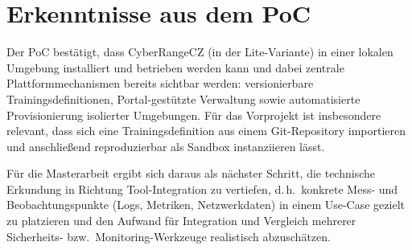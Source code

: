 \section{Erkenntnisse aus dem PoC}
\label{sec:poc-erkenntnisse}

Der PoC bestätigt, dass CyberRangeCZ (in der Lite-Variante) in einer lokalen Umgebung
installiert und betrieben werden kann und dabei zentrale Plattformmechanismen bereits sichtbar werden:
versionierbare Trainingsdefinitionen, Portal-gestützte Verwaltung sowie automatisierte Provisionierung
isolierter Umgebungen. Für das Vorprojekt ist insbesondere relevant, dass sich eine Trainingsdefinition
aus einem Git-Repository importieren und anschließend reproduzierbar als Sandbox instanziieren lässt.

Für die Masterarbeit ergibt sich daraus als nächster Schritt, die technische Erkundung in Richtung
Tool-Integration zu vertiefen, d.\,h.\ konkrete Mess- und Beobachtungspunkte (Logs, Metriken,
Netzwerkdaten) in einem Use-Case gezielt zu platzieren und den Aufwand für Integration und Vergleich
mehrerer Sicherheits- bzw.\ Monitoring-Werkzeuge realistisch abzuschätzen.
